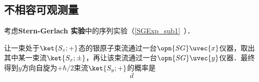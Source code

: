 \subsection{不相容可观测量}


考虑\textbf{Stern-Gerlach 实验}中的序列实验（\autoref{SGExp_sub1}~）．

让一束处于$\ket{S_z; +}$态的银原子束流通过一台$\opn{SG}\uvec{x}$仪器，取出其中某一束流$\ket{S_x; \pm}$，再让该束流通过一台$\opn{SG}\uvec{y}$仪器．最终得到$y$方向自旋为$+\hbar/2$束流$\ket{S_y; +}$的概率是
\begin{equation}
d
\end{equation}


























